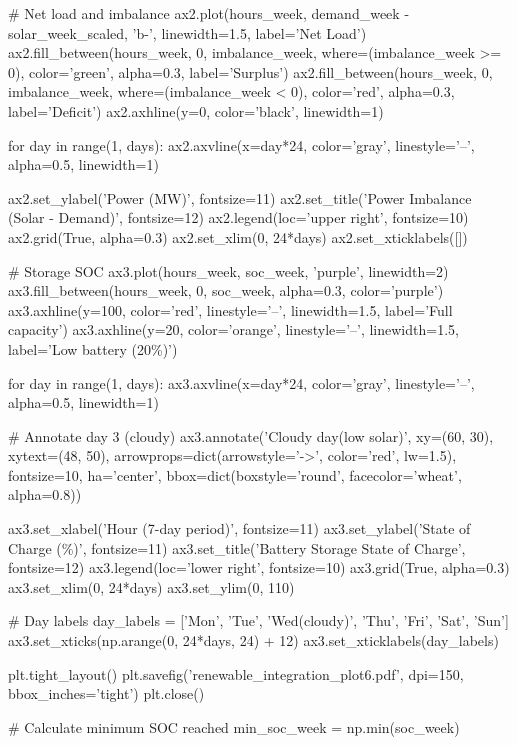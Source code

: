 \documentclass[11pt,a4paper]{article}
\begin{document}
\begin{pycode}
# Net load and imbalance
ax2.plot(hours_week, demand_week - solar_week_scaled, 'b-', linewidth=1.5, label='Net Load')
ax2.fill_between(hours_week, 0, imbalance_week, where=(imbalance_week >= 0),
                  color='green', alpha=0.3, label='Surplus')
ax2.fill_between(hours_week, 0, imbalance_week, where=(imbalance_week < 0),
                  color='red', alpha=0.3, label='Deficit')
ax2.axhline(y=0, color='black', linewidth=1)

for day in range(1, days):
    ax2.axvline(x=day*24, color='gray', linestyle='--', alpha=0.5, linewidth=1)

ax2.set_ylabel('Power (MW)', fontsize=11)
ax2.set_title('Power Imbalance (Solar - Demand)', fontsize=12)
ax2.legend(loc='upper right', fontsize=10)
ax2.grid(True, alpha=0.3)
ax2.set_xlim(0, 24*days)
ax2.set_xticklabels([])

# Storage SOC
ax3.plot(hours_week, soc_week, 'purple', linewidth=2)
ax3.fill_between(hours_week, 0, soc_week, alpha=0.3, color='purple')
ax3.axhline(y=100, color='red', linestyle='--', linewidth=1.5, label='Full capacity')
ax3.axhline(y=20, color='orange', linestyle='--', linewidth=1.5, label='Low battery (20\%)')

for day in range(1, days):
    ax3.axvline(x=day*24, color='gray', linestyle='--', alpha=0.5, linewidth=1)

# Annotate day 3 (cloudy)
ax3.annotate('Cloudy day\n(low solar)', xy=(60, 30), xytext=(48, 50),
            arrowprops=dict(arrowstyle='->', color='red', lw=1.5),
            fontsize=10, ha='center', bbox=dict(boxstyle='round', facecolor='wheat', alpha=0.8))

ax3.set_xlabel('Hour (7-day period)', fontsize=11)
ax3.set_ylabel('State of Charge (\%)', fontsize=11)
ax3.set_title('Battery Storage State of Charge', fontsize=12)
ax3.legend(loc='lower right', fontsize=10)
ax3.grid(True, alpha=0.3)
ax3.set_xlim(0, 24*days)
ax3.set_ylim(0, 110)

# Day labels
day_labels = ['Mon', 'Tue', 'Wed\n(cloudy)', 'Thu', 'Fri', 'Sat', 'Sun']
ax3.set_xticks(np.arange(0, 24*days, 24) + 12)
ax3.set_xticklabels(day_labels)

plt.tight_layout()
plt.savefig('renewable_integration_plot6.pdf', dpi=150, bbox_inches='tight')
plt.close()

# Calculate minimum SOC reached
min_soc_week = np.min(soc_week)
\end{pycode}
\end{document}

